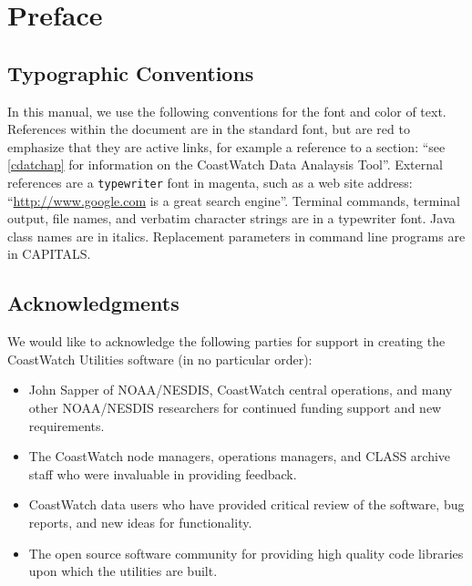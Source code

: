 \newpage

\tableofcontents
\newpage

\listoffigures
\newpage

\setcounter{page}{1}

\chapter*{Preface}

\section*{Typographic Conventions}

In this manual, we use the following conventions for the font and
color of text.  References within the document are in the
standard font, but are red to emphasize that they are active
links, for example a reference to a section: ``see
\autoref{cdatchap} for information on the CoastWatch Data
Analaysis Tool''.  External references are a {\tt typewriter}
font in magenta, such as a web site address:
``\url{http://www.google.com} is a great search engine''.
Terminal commands, terminal output, file names, and verbatim
character strings are in a {\file typewriter} font.  Java class
names are in {\java italics}.  Replacement parameters in command
line programs are in CAPITALS.

\section*{Acknowledgments}

We would like to acknowledge the following parties for support in
creating the CoastWatch Utilities software (in no particular
order):
\begin{itemize}

  \item John Sapper of NOAA/NESDIS, CoastWatch central
  operations, and many other NOAA/NESDIS researchers for
  continued funding support and new requirements.

  \item The CoastWatch node managers, operations managers, and
  CLASS archive staff who were invaluable in providing feedback.

  \item CoastWatch data users who have provided critical review
  of the software, bug reports, and new ideas for functionality.

  \item The open source software community for providing high
  quality code libraries upon which the utilities are built.

\end{itemize}
